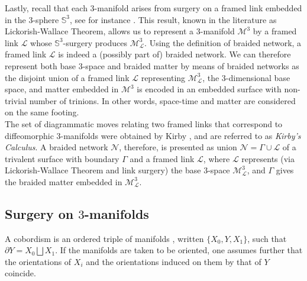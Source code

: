 \documentclass[aps,nofootinbib,amsfonts,superscriptaddress]{revtex4}
\begin{document}
Lastly, recall that each $3$-manifold arises from surgery on a framed link embedded in the $3$-sphere $\mathbb S^3$, see for instance \cite{Lick}. This result, known in the literature as Lickorish-Wallace Theorem, allows us to represent a $3$-manifold $\mathcal M^3$ by a framed link $\mathcal L$ whose $\mathbb S^3$-surgery produces $\mathcal M_{\mathcal L}^3$. Using the definition of braided network, a framed link $\mathcal L$ is indeed a (possibly part of) braided network. We can therefore represent both base $3$-space and braided matter by means of braided networks as the disjoint union of a framed link $\mathcal L$ representing $\mathcal M_{\mathcal L}^3$, the $3$-dimensional base space, and matter embedded in $\mathcal M^3$ is encoded in an embedded surface with non-trivial number of trinions. In other words, space-time and matter are considered on the same footing.\\

The set of diagrammatic moves relating two framed links that correspond to diffeomorphic $3$-manifolds were obtained by Kirby \cite{Kir}, and are referred to as {\it Kirby's Calculus}. A braided network $\mathcal N$, therefore, is presented as union $\mathcal N = \Gamma\cup \mathcal L$ of a trivalent surface with boundary $\Gamma$ and a framed link $\mathcal L$, where $\mathcal L$ represents (via Lickorish-Wallace Theorem and link surgery) the base $3$-space $\mathcal M^3_{\mathcal L}$, and $\Gamma$ gives the braided matter embedded in $\mathcal M^3_{\mathcal L}$. 


\subsection{Surgery on $3$-manifolds}\label{Surgery}

A cobordism is an ordered triple of manifolds \cite{Kos}, written $\{X_0,Y,X_1\}$, such that $\partial Y = X_0\bigsqcup X_1$. If the manifolds are taken to be oriented, one assumes further that the orientations of $X_i$ and the orientations induced on them by that of $Y$ coincide. \\
\end{document}
